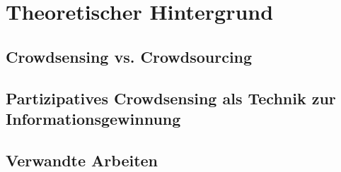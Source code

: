 \chapter{Theoretischer Hintergrund} %

\section{Crowdsensing vs. Crowdsourcing}

\section{Partizipatives Crowdsensing als Technik zur Informationsgewinnung}

\section{Verwandte Arbeiten}